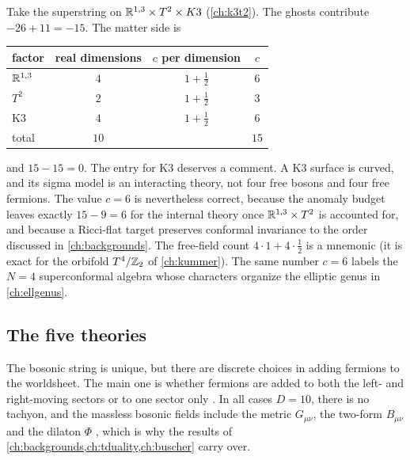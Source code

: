 \begin{example}\label{ex:ghosts:budget}
Take the superstring on $\mathbb{R}^{1,3}\times T^2\times K3$ (\cref{ch:k3t2}). The ghosts contribute
$-26+11=-15$. The matter side is
\begin{center}
\begin{tabular}{@{}lccc@{}}
\toprule
factor & real dimensions & $c$ per dimension & $c$\\
\midrule
$\mathbb{R}^{1,3}$ & $4$ & $1+\tfrac12$ & $6$\\
$T^2$ & $2$ & $1+\tfrac12$ & $3$\\
K3 & $4$ & $1+\tfrac12$ & $6$\\
\midrule
total & $10$ & & $15$\\
\bottomrule
\end{tabular}
\end{center}
and $15-15=0$. The entry for K3 deserves a comment. A K3 surface is curved, and its sigma
model is an interacting theory, not four free bosons and four free fermions. The value $c=6$
is nevertheless correct, because the anomaly budget leaves exactly $15-9=6$ for the internal
theory once $\mathbb{R}^{1,3}\times T^2$ is accounted for, and because a Ricci-flat target preserves
conformal invariance to the order discussed in \cref{ch:backgrounds}. The free-field count
$4\cdot1+4\cdot\tfrac12$ is a mnemonic (it is exact for the orbifold $T^4/\mathbb{Z}_2$ of
\cref{ch:kummer}). The same number $c=6$ labels the $N=4$ superconformal algebra whose
characters organize the elliptic genus in \cref{ch:ellgenus}.
\end{example}

\subsection{The five theories}

The bosonic string is unique, but there are discrete choices in adding fermions to the
worldsheet. The main one is whether fermions are added to both the left- and right-moving
sectors or to one sector only . In all cases $D=10$,
there is no tachyon, and the massless bosonic fields include the metric $G_{\mu\nu}$, the
two-form $B_{\mu\nu}$ and the dilaton $\Phi$ , which is why
the results of \cref{ch:backgrounds,ch:tduality,ch:buscher} carry over.

